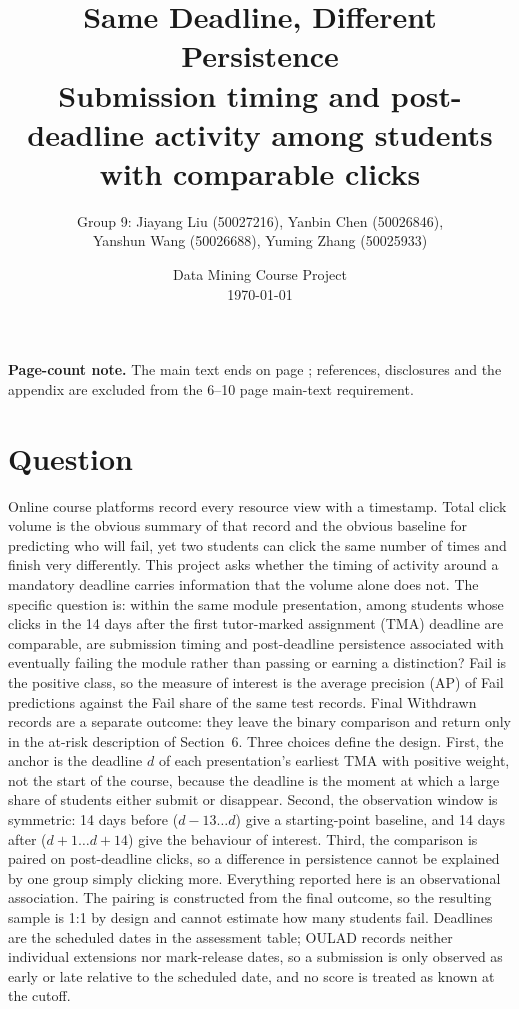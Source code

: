 \documentclass[11pt]{article}
\title{Same Deadline, Different Persistence\\\large Submission timing and post-deadline activity among students with comparable clicks}
\author{Group 9: Jiayang Liu (50027216), Yanbin Chen (50026846),\\ Yanshun Wang (50026688), Yuming Zhang (50025933)}
\date{Data Mining Course Project \\ \today}
\begin{document}
\maketitle
\noindent\textbf{Page-count note.} The main text ends on page \pageref{endmain}; references, disclosures and the appendix are excluded from the 6--10 page main-text requirement.
\section{Question}
Online course platforms record every resource view with a timestamp. Total click volume is the obvious summary of that record and the obvious baseline for predicting who will fail, yet two students can click the same number of times and finish very differently. This project asks whether the timing of activity around a mandatory deadline carries information that the volume alone does not.
The specific question is: within the same module presentation, among students whose clicks in the 14 days after the first tutor-marked assignment (TMA) deadline are comparable, are submission timing and post-deadline persistence associated with eventually failing the module rather than passing or earning a distinction? Fail is the positive class, so the measure of interest is the average precision (AP) of Fail predictions against the Fail share of the same test records. Final Withdrawn records are a separate outcome: they leave the binary comparison and return only in the at-risk description of Section~6.
Three choices define the design. First, the anchor is the deadline $d$ of each presentation's earliest TMA with positive weight, not the start of the course, because the deadline is the moment at which a large share of students either submit or disappear. Second, the observation window is symmetric: 14 days before ($d-13\ldots d$) give a starting-point baseline, and 14 days after ($d+1\ldots d+14$) give the behaviour of interest. Third, the comparison is paired on post-deadline clicks, so a difference in persistence cannot be explained by one group simply clicking more.
Everything reported here is an observational association. The pairing is constructed from the final outcome, so the resulting sample is 1:1 by design and cannot estimate how many students fail. Deadlines are the scheduled dates in the assessment table; OULAD records neither individual extensions nor mark-release dates, so a submission is only observed as early or late relative to the scheduled date, and no score is treated as known at the cutoff.
\end{document}
